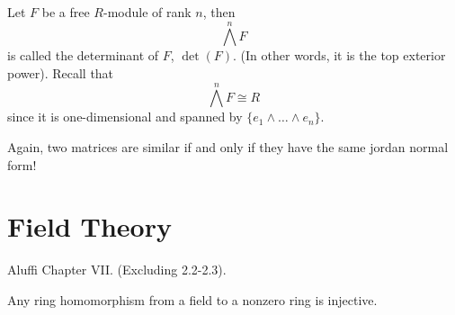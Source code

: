 \documentclass[openany]{book}
\begin{document}
\begin{defn}[determinant]
    Let $F$ be a free $R$-module of rank $n$, then 
    \begin{equation*}
        \bigwedge^nF
    \end{equation*}
    is called the determinant of $F$, $\det(F)$. (In other words, it is the top exterior power). Recall that 
    \begin{equation*}
        \bigwedge^nF\cong R
    \end{equation*}
    since it is one-dimensional and spanned by $\{e_1\wedge\dots\wedge e_n\}$.
\end{defn}

\begin{warn}
    Again, two matrices are similar if and only if they have the same jordan normal form!
\end{warn}

























































\chapter{Field Theory}

Aluffi Chapter VII. (Excluding 2.2-2.3).


\begin{prop}
    Any ring homomorphism from a field to a nonzero ring is injective.
\end{prop}
\end{document}
